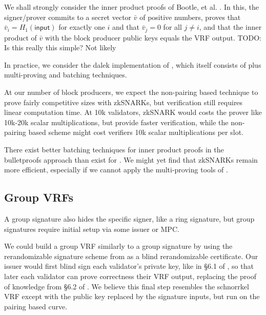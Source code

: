 
We shall strongly consider the inner product proofs of Bootle, et al. \cite{bccgp2016}.  In this, the signer/prover commits to a secret vector $\bar{v}$ of positive numbers, proves that $\bar{v}_i = H_1(\mathsf{input})$ for exactly one $i$ and that $\bar{v}_j = 0$ for all $j \ne i$, and that the inner product of $\bar{v}$ with the block producer public keys equals the VRF output.  TODO:  Is this really this simple?  Not likely

In practice, we consider the dalek implementation \cite{dalek_bulletproofs} of \cite{bulletproofs}, which itself consists of \cite{bccgp2016} plus multi-proving and batching techniques.

At our number of block producers, we expect the non-pairing based technique to prove fairly competitive sizes with zkSNARKs, but verification still requires linear computation time.  At 10k validators, zkSNARK would costs the prover like 10k-20k scalar multiplications, but provide faster verification, while the non-pairing based scheme might cost verifiers 10k scalar multiplications per slot.  

There exist better batching techniques for inner product proofs \cite{bccgp2016} in the bulletproofs approach \cite{bulletproofs} than exist for \cite{Groth16}.  We might yet find that zkSNARKs remain more efficient, especially if we cannot apply the multi-proving tools of \cite{bulletproofs}.

\subsection{Group VRFs}

A group signature also hides the specific signer, like a ring signature, but group signatures require initial setup via some issuer or MPC. 

We could build a group VRF similarly to a group signature by using the rerandomizable signature scheme from \cite{PS16} as a blind rerandomizable certificate.  Our issuer would first blind sign each validator's private key, like in \S6.1 of \cite{PS16}, so that later each validator can prove correctness their VRF output, replacing the proof of knowledge from \S6.2 of \cite{PS16}.  We believe this final step resembles the schnorrkel VRF except with the public key replaced by the signature inputs, but run on the pairing based curve.

